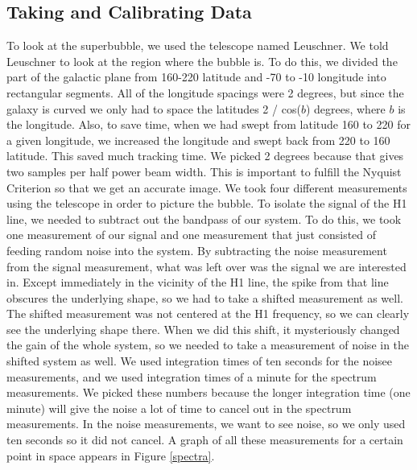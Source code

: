 \documentclass[11pt]{article}
\begin{document}
\subsection{Taking and Calibrating Data}
To look at the superbubble, we used the telescope named Leuschner. We told Leuschner to look at the region where the bubble is. To do this, we divided the part of the galactic plane from 160-220 latitude and -70 to -10 longitude into rectangular segments. All of the longitude spacings were 2 degrees, but since the galaxy is curved we only had to space the latitudes 2 / cos($b$) degrees, where $b$ is the longitude. Also, to save time, when we had swept from latitude 160 to 220 for a given longitude, we increased the longitude and swept back from 220 to 160 latitude. This saved much tracking time. We picked 2 degrees because that gives two samples per half power beam width. This is important to fulfill the Nyquist Criterion so that we get an accurate image. 
We took four different measurements using the telescope in order to picture the bubble. To isolate the signal of the H1 line, we needed to subtract out the bandpass of our system. To do this, we took one measurement of our signal and one measurement that just consisted of feeding random noise into the system. By subtracting the noise measurement from the signal measurement, what was left over was the signal we are interested in. Except immediately in the vicinity of the H1 line, the spike from that line obscures the underlying shape, so we had to take a shifted measurement as well. The shifted measurement was not centered at the H1 frequency, so we can clearly see the underlying shape there. When we did this shift, it mysteriously changed the gain of the whole system, so we needed to take a measurement of noise in the shifted system as well. We used integration times of ten seconds for the noisee measurements, and we used integration times of a minute for the spectrum measurements. We picked these numbers because the longer integration time (one minute) will give the noise a lot of time to cancel out in the spectrum measurements. In the noise measurements, we want to see noise, so we only used ten seconds so it did not cancel. A graph of all these measurements for a certain point in space appears in Figure \ref{spectra}.
\end{document}

